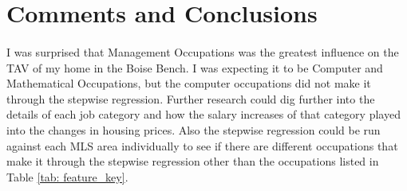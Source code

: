 \documentclass{article}
\begin{document}
\section{Comments and Conclusions}
\paragraph{}I was surprised that Management Occupations was the greatest influence on the TAV of my home in the Boise Bench. I was expecting it to be Computer and Mathematical Occupations, but the computer occupations did not make it through the stepwise regression. Further research could dig further into the details of each job category and how the salary increases of that category played into the changes in housing prices. Also the stepwise regression could be run against each MLS area individually to see if there are different occupations that make it through the stepwise regression other than the occupations listed in Table \ref{tab: feature_key}.
\end{document}
